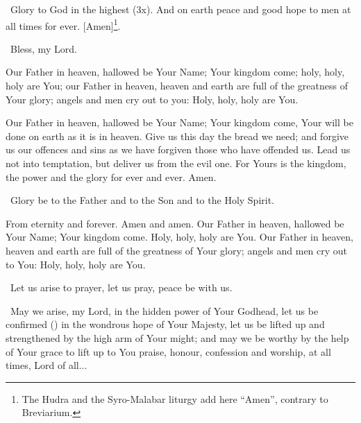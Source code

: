 \documentclass[12pt,twoside,a5paper]{article}
\begin{document}
\begin{halfparskip}

  \cc~Glory to God in the highest (3x). And on earth peace and good hope to men at all times for ever. [Amen]\footnote{The Hudra and the Syro-Malabar liturgy add here ``Amen'', contrary to Breviarium.}.

  \rr~Bless, my Lord. 

  Our Father in heaven, hallowed be Your Name; Your kingdom come; holy, holy, holy are You; our Father in heaven, heaven and earth are full of the greatness of Your glory; angels and men cry out to you: Holy, holy, holy are You.

  Our Father in heaven, hallowed be Your Name; Your kingdom come, Your will be done on earth as it is in heaven. Give us this day the bread we need; and forgive us our offences and sins as we have forgiven those who have offended us. Lead us not into temptation, but deliver us from the evil one. For Yours is the kingdom, the power and the glory for ever and ever. Amen.

  \cc~Glory be to the Father and to the Son and to the Holy Spirit.

  From eternity and forever. Amen and amen. Our Father in heaven, hallowed be Your Name; Your kingdom come. Holy, holy, holy are You. Our Father in heaven, heaven and earth are full of the greatness of Your glory; angels and men cry out to You: Holy, holy, holy are You.
\end{halfparskip}

\dd~Let us arise to prayer, let us pray, peace be with us.

\cc~May we arise, my Lord, in the hidden power of Your Godhead, let us be confirmed () in the wondrous hope of Your Majesty, let us be lifted up and strengthened by the high arm of Your might; and may we be worthy by the help of Your grace to lift up to You praise, honour, confession and worship, at all times, Lord of all...



\end{document}
